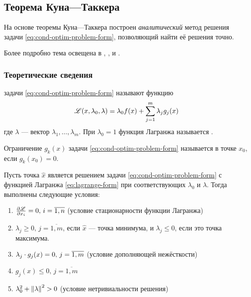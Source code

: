 \subsection{Теорема Куна—Таккера}
\label{sec:kuhn-tucker}

На основе теоремы Куна—Таккера построен \emph{аналитический} метод
решения задачи \eqref{eq:cond-optim-problem-form}, позволяющий найти
её решения точно. 

Более подробно тема освещена в \cite{alekseev05}, \cite{izmailov05},
\cite{taha05} и \cite{polovinkin04}.

\subsubsection{Теоретические сведения}

\begin{dfn}  задачи
  \eqref{eq:cond-optim-problem-form} называют функцию
  \begin{equation}
    \label{eq:lagrange-form}
    \mathscr{L}(x, \lambda_0, \lambda) = \lambda_0 f(x) + \sum_{j=1}^m {\lambda_j g_j(x)}
  \end{equation}
  где $\lambda$ — вектор $\lambda_1, \dotsc, \lambda_m$. При
  $\lambda_0=1$ функция Лагранжа называется .
\end{dfn}

\begin{dfn}
  \label{dfn:active-constraint}
  Ограничение $g_k(x)$ задачи \eqref{eq:cond-optim-problem-form}
  называется  в точке $x_0$, если $g_k(x_0)=0$.
\end{dfn}

\begin{thm}
  \label{th:kuhn-tucker}
  Пусть точка $\hat{x}$ является решением задачи
  \eqref{eq:cond-optim-problem-form} с функцией Лагранжа
  \eqref{eq:lagrange-form} при соответствующих $\lambda_0$ и
  $\lambda$. Тогда выполнены следующие условия:
  \begin{enumerate}
    \renewcommand{\labelenumi}{\emph{\asbuk{enumi})}}
  \item $\frac{\partial{\mathscr{L}}}{\partial{x_i}}=0,\, i=\overline{1,n}$ (условие
    стационарности функции Лагранжа)
  \item $\lambda_j \geq 0,\, j=\overline{1,m}$, если $\hat{x}$ — точка
    минимума, и $\lambda_j \leq 0$, если это точка максимума.
  \item $\lambda_j \cdot g_j(x) = 0,\, j=\overline{1,m}$ (условие
    дополняющей нежёсткости)
  \item $g_j(x) \leq 0,\, j=\overline{1,m}$
  \item $\lambda_0^2 + \left \lVert{\lambda}\right \rVert^2 > 0$ (условие нетривиальности решения)
  \end{enumerate}
\end{thm}

